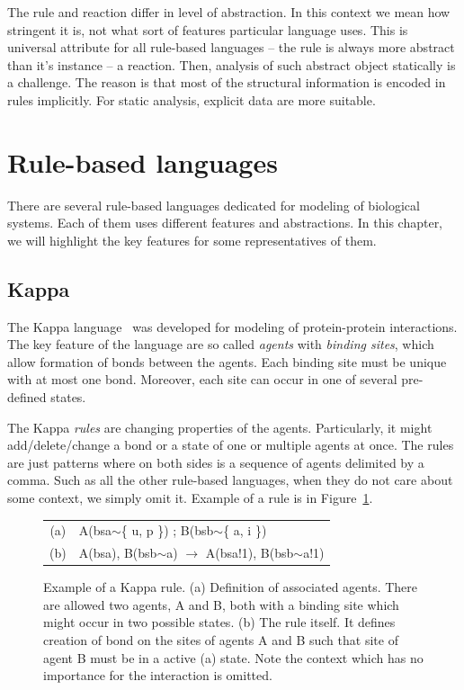 \documentclass[12pt]{fithesis2}
\begin{document}
The rule and reaction differ in level of abstraction. In this context we mean how stringent it is, not what sort of features particular language uses. This is universal attribute for all rule-based languages -- the rule is always more abstract than it's instance -- a reaction. Then, analysis of such abstract object statically is a challenge. The reason is that most of the structural information is encoded in rules implicitly. For static analysis, explicit data are more suitable.

\section{Rule-based languages}
\label{rule_based_languages}

There are several rule-based languages dedicated for modeling of biological systems. Each of them uses different features and abstractions. In this chapter, we will highlight the key features for some representatives of them.

\subsection{Kappa}
\label{kappa}

The Kappa language~\cite{kappa_formal} was developed for modeling of protein-protein interactions. The key feature of the language are so called \textit{agents} with \textit{binding sites}, which allow formation of bonds between the agents. Each binding site must be unique with at most one bond. Moreover, each site can occur in one of several pre-defined states.

The Kappa \textit{rules} are changing properties of the agents. Particularly, it might add/delete/change a bond or a state of one or multiple agents at once. The rules are just patterns where on both sides is a sequence of agents delimited by a comma. Such as all the other rule-based languages, when they do not care about some context, we simply omit it. Example of a rule is in Figure~\ref{kappa-rule}.

\begin{figure}[!h]
\begin{center}
\begin{tabular}{c l}
(a) & A(bsa$\sim$\{ u, p \}) ; B(bsb$\sim$\{ a, i \}) \\
(b) & A(bsa), B(bsb$\sim$a) $\rightarrow$ A(bsa!1), B(bsb$\sim$a!1) \\
\end{tabular}
\end{center}
\caption{Example of a Kappa rule. (a) Definition of associated agents. There are allowed two agents, A and B, both with a binding site which might occur in two possible states. (b) The rule itself. It defines creation of bond on the sites of agents A and B such that site of agent B must be in a active (a) state. Note the context which has no importance for the interaction is omitted.}\label{kappa-rule}
\end{figure}
\end{document}
